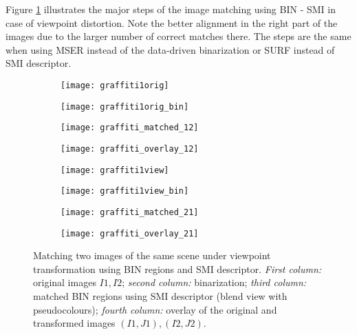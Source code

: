 \documentclass[a4paper,11pt]{article}
\begin{document}
Figure \ref{fig:matching1} illustrates the major steps of the image matching using BIN - SMI in case of viewpoint distortion. Note the better alignment in the right part of the images due to the larger number of correct matches there. The steps are the same when using MSER instead of the data-driven binarization or SURF instead of SMI descriptor.

\begin{figure}[h]
 \vspace{-10pt} 
\begin{center}
\begin{subfigure}[b]{0.22\textwidth}
  \texttt{[image: graffiti1orig]}
\end{subfigure}
\begin{subfigure}[b]{0.22\textwidth}
\texttt{[image: graffiti1orig\_bin]}
\end{subfigure}
\begin{subfigure}[b]{0.22\textwidth}
  \texttt{[image: graffiti\_matched\_12]}
\end{subfigure}
\begin{subfigure}[b]{0.22\textwidth}
\texttt{[image: graffiti\_overlay\_12]}
\end{subfigure}
\end{center}
\vspace{-22pt}
\begin{center}
\begin{subfigure}[b]{0.22\textwidth}
  \texttt{[image: graffiti1view]}
\end{subfigure}
\begin{subfigure}[b]{0.22\textwidth}
\texttt{[image: graffiti1view\_bin]}
\end{subfigure}
\begin{subfigure}[b]{0.22\textwidth}
  \texttt{[image: graffiti\_matched\_21]}
\end{subfigure}
\begin{subfigure}[b]{0.22\textwidth}
\texttt{[image: graffiti\_overlay\_21]}
\end{subfigure}
\end{center}
\vspace{-20pt}
\caption{\small Matching two images of the same scene under viewpoint transformation using BIN regions and SMI descriptor. {\em First column:} original images $I1, I2$; {\em second column:} binarization; {\em third column:} matched BIN regions using SMI descriptor (blend view with pseudocolours); {\em fourth column:} overlay of the original and transformed images $(I1, J1), (I2, J2)$. }
\label{fig:matching1}
  \vspace{-12pt}
\end{figure}
\end{document}
